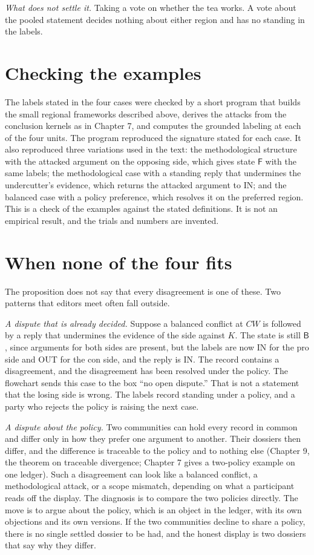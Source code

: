 \documentclass[11pt]{article}
\newcommand{\IN}{\textsf{IN}}
\newcommand{\OUT}{\textsf{OUT}}
\begin{document}
\emph{What does not settle it.} Taking a vote on whether the tea works. A vote about the pooled statement decides nothing about either region and has no standing in the labels.

\section{Checking the examples}\label{sec:check}

The labels stated in the four cases were checked by a short program that builds the small regional frameworks described above, derives the attacks from the conclusion kernels as in Chapter 7, and computes the grounded labeling at each of the four units. The program reproduced the signature stated for each case. It also reproduced three variations used in the text: the methodological structure with the attacked argument on the opposing side, which gives state $\mathsf F$ with the same labels; the methodological case with a standing reply that undermines the undercutter's evidence, which returns the attacked argument to \IN{}; and the balanced case with a policy preference, which resolves it on the preferred region. This is a check of the examples against the stated definitions. It is not an empirical result, and the trials and numbers are invented.

\section{When none of the four fits}\label{sec:none}

The proposition does not say that every disagreement is one of these. Two patterns that editors meet often fall outside.

\emph{A dispute that is already decided.} Suppose a balanced conflict at $CW$ is followed by a reply that undermines the evidence of the side against $K$. The state is still $\mathsf B$, since arguments for both sides are present, but the labels are now \IN{} for the pro side and \OUT{} for the con side, and the reply is \IN{}. The record contains a disagreement, and the disagreement has been resolved under the policy. The flowchart sends this case to the box ``no open dispute.'' That is not a statement that the losing side is wrong. The labels record standing under a policy, and a party who rejects the policy is raising the next case.

\emph{A dispute about the policy.} Two communities can hold every record in common and differ only in how they prefer one argument to another. Their dossiers then differ, and the difference is traceable to the policy and to nothing else (Chapter 9, the theorem on traceable divergence; Chapter 7 gives a two-policy example on one ledger). Such a disagreement can look like a balanced conflict, a methodological attack, or a scope mismatch, depending on what a participant reads off the display. The diagnosis is to compare the two policies directly. The move is to argue about the policy, which is an object in the ledger, with its own objections and its own versions. If the two communities decline to share a policy, there is no single settled dossier to be had, and the honest display is two dossiers that say why they differ.
\end{document}
